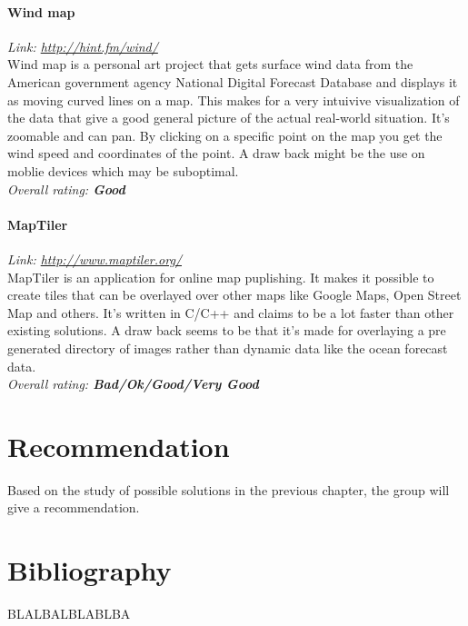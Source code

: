 \documentclass[11pt,a4paper,titlepage,oneside]{report}
\begin{document}
\subsubsection{Wind map}
\emph{Link: \url{http://hint.fm/wind/}} \\%
  Wind map is a personal art project that gets surface wind data from the American government agency National Digital Forecast Database and displays it as moving curved lines on a map. This makes for a very intuivive visualization of the data that give a good general picture of the actual real-world situation. It's zoomable and can pan. By clicking on a specific point on the map you get the wind speed and coordinates of the point. A draw back might be the use on moblie devices which may be suboptimal.
\\ \emph{Overall rating: \textbf{Good}}

\subsubsection{MapTiler}
\emph{Link: \url{http://www.maptiler.org/}} \\%
  MapTiler is an application for online map puplishing. It makes it possible to create tiles that can be overlayed over other maps like Google Maps, Open Street Map and others. It's written in C/C++ and claims to be a lot faster than other existing solutions. A draw back seems to be that it's made for overlaying a pre generated directory of images rather than dynamic data like the ocean forecast data.
\\ \emph{Overall rating: \textbf{Bad/Ok/Good/Very Good}}


\chapter{Recommendation}
Based on the study of possible solutions in the previous chapter, the group will give a recommendation.


\chapter{Bibliography}

\begin{flushleft}
	
	 BLALBALBLABLBA
\end{flushleft}

\appendix
\end{document}
